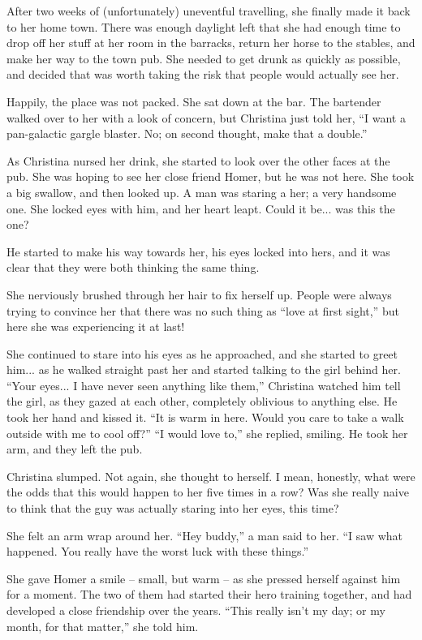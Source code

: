 \documentclass[showtrims,b6paper,draft,10pt]{memoir}
\begin{document}
After two weeks of (unfortunately) uneventful travelling, she finally made it back to her home town.  There was enough daylight left that she had enough time to drop off her stuff at her room in the barracks, return her horse to the stables, and make her way to the town pub.  She needed to get drunk as quickly as possible, and decided that was worth taking the risk that people would actually see her.

Happily, the place was not packed.  She sat down at the bar.  The bartender walked over to her with a look of concern, but Christina just told her, ``I want a pan-galactic gargle blaster.  No; on second thought, make that a double.''

As Christina nursed her drink, she started to look over the other faces at the pub.  She was hoping to see her close friend Homer, but he was not here.  She took a big swallow, and then looked up.  A man was staring a her;  a very handsome one.  She locked eyes with him, and her heart leapt.  Could it be... was this the one?

He started to make his way towards her, his eyes locked into hers, and it was clear that they were both thinking the same thing.

She nerviously brushed through her hair to fix herself up.  People were always trying to convince her that there was no such thing as ``love at first sight,'' but here she was experiencing it at last!

She continued to stare into his eyes as he approached, and she started to greet him... as he walked straight past her and started talking to the girl behind her.  ``Your eyes... I have never seen anything like them,''  Christina watched him tell the girl, as they gazed at each other, completely oblivious to anything else.  He took her hand and kissed it.  ``It is warm in here.  Would you care to take a walk outside with me to cool off?''  ``I would love to,'' she replied, smiling.  He took her arm, and they left the pub.

Christina slumped.  Not again, she thought to herself.  I mean, honestly, what were the odds that this would happen to her five times in a row?  Was she really naive to think that the guy was actually staring into her eyes, this time?

She felt an arm wrap around her.  ``Hey buddy,'' a man said to her.  ``I saw what happened.  You really have the worst luck with these things.''

She gave Homer a smile -- small, but warm -- as she pressed herself against him for a moment.  The two of them had started their hero training together, and had developed a close friendship over the years.  ``This really isn't my day;  or my month, for that matter,'' she told him.
\end{document}
